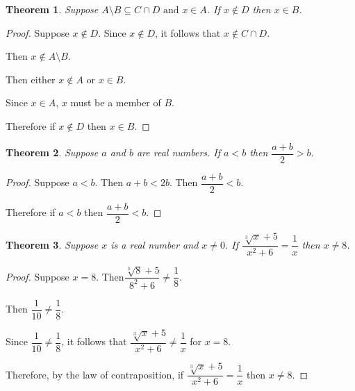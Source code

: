 \documentclass[14pt,a4paper]{extarticle}
\newtheorem{theorem}{Theorem}
\begin{document}
\newpage

\begin{theorem}
Suppose ${A \setminus B \subseteq C \cap D \text{ and } x \in A}$. If ${x \notin D}$ then ${x \in B}$.
\end{theorem}

\begin{proof}
Suppose ${x \notin D}$. Since ${x \notin D}$, it follows that ${x \notin C \cap D}$.

Then ${x \notin A \setminus B}$.

Then either ${x \notin A}$ or ${x \in B}$.

Since ${x \in A}$, $x$ must be a member of $B$.

Therefore if ${x \notin D}$ then ${x \in B}$.
\end{proof}

\begin{theorem}
Suppose $a$ and $b$ are real numbers. If ${a < b}$ then ${\dfrac{a + b}{2} > b}$.
\end{theorem}

\begin{proof}
Suppose ${a < b}$. Then ${a + b < 2b}$. Then ${\dfrac{a+b}{2} < b}$.

Therefore if ${a < b}$ then ${\dfrac{a + b}{2} < b}$.
\end{proof}

\begin{theorem}
Suppose $x$ is a real number and ${x \ne 0}$. If ${\dfrac{\sqrt[3]{x} + 5}{x^2 + 6} = \dfrac{1}{x}}$ then ${x \ne 8}$.
\end{theorem}

\begin{proof}
Suppose ${x = 8}$. Then${\dfrac{\sqrt[3]{8} + 5}{8^2 + 6} \ne \dfrac{1}{8}}$.

Then ${\dfrac{1}{10} \ne \dfrac{1}{8}}$.

Since ${\dfrac{1}{10} \ne \dfrac{1}{8}}$, it follows that ${\dfrac{\sqrt[3]{x} + 5}{x^2 + 6} \ne \dfrac{1}{x}}$ for ${x = 8}$.

Therefore, by the law of contraposition, if ${\dfrac{\sqrt[3]{x} + 5}{x^2 + 6} = \dfrac{1}{x}}$ then  ${x \ne 8}$.
\end{proof}
\end{document}
